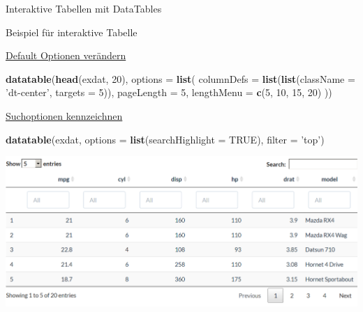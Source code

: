 \documentclass[ignorenonframetext,]{beamer}
\newenvironment{Shaded}{}{}
\newcommand{\KeywordTok}[1]{\textcolor[rgb]{0.00,0.44,0.13}{\textbf{{#1}}}}
\newcommand{\DataTypeTok}[1]{\textcolor[rgb]{0.56,0.13,0.00}{{#1}}}
\newcommand{\DecValTok}[1]{\textcolor[rgb]{0.25,0.63,0.44}{{#1}}}
\newcommand{\StringTok}[1]{\textcolor[rgb]{0.25,0.44,0.63}{{#1}}}
\newcommand{\OtherTok}[1]{\textcolor[rgb]{0.00,0.44,0.13}{{#1}}}
\newcommand{\NormalTok}[1]{{#1}}
\begin{document}
\begin{frame}[fragile]{Interaktive Tabellen mit DataTables}
\begin{block}{Beispiel für interaktive Tabelle}
\end{block}

\begin{block}{\href{http://rstudio.github.io/DT/options.html}{Default
Optionen verändern}}

\begin{Shaded}
\begin{Highlighting}[]
\KeywordTok{datatable}\NormalTok{(}\KeywordTok{head}\NormalTok{(exdat, }\DecValTok{20}\NormalTok{), }\DataTypeTok{options =} \KeywordTok{list}\NormalTok{(}
  \DataTypeTok{columnDefs =} \KeywordTok{list}\NormalTok{(}\KeywordTok{list}\NormalTok{(}\DataTypeTok{className =} \StringTok{'dt-center'}\NormalTok{, }\DataTypeTok{targets =} \DecValTok{5}\NormalTok{)),}
  \DataTypeTok{pageLength =} \DecValTok{5}\NormalTok{,}
  \DataTypeTok{lengthMenu =} \KeywordTok{c}\NormalTok{(}\DecValTok{5}\NormalTok{, }\DecValTok{10}\NormalTok{, }\DecValTok{15}\NormalTok{, }\DecValTok{20}\NormalTok{)}
\NormalTok{))}
\end{Highlighting}
\end{Shaded}

\end{block}

\begin{block}{\href{http://rstudio.github.io/DT/006-highlight.html}{Suchoptionen
kennzeichnen}}

\begin{Shaded}
\begin{Highlighting}[]
\KeywordTok{datatable}\NormalTok{(exdat, }\DataTypeTok{options =} \KeywordTok{list}\NormalTok{(}\DataTypeTok{searchHighlight =} \OtherTok{TRUE}\NormalTok{), }
          \DataTypeTok{filter =} \StringTok{'top'}\NormalTok{)}
\end{Highlighting}
\end{Shaded}

\includegraphics{./tex2pdf.9796/cc602f47359ab693f11f94fcacceaf5d56c238d9.png}

\end{block}

\end{frame}
\end{document}
